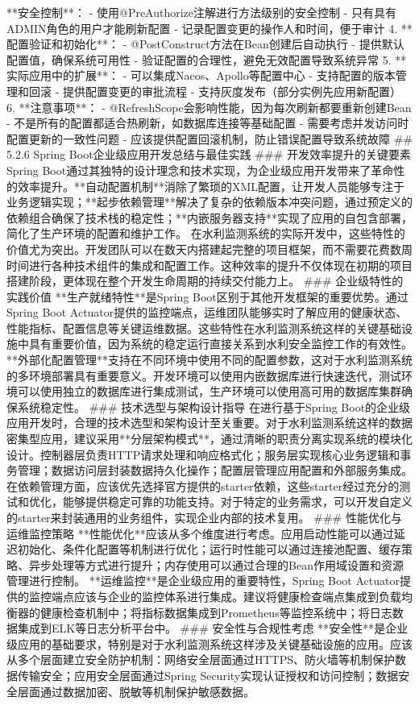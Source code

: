 {{**安全控制**： - 使用@PreAuthorize注解进行方法级别的安全控制 - 只有具有ADMIN角色的用户才能刷新配置 - 记录配置变更的操作人和时间，便于审计 4. **配置验证和初始化**： - @PostConstruct方法在Bean创建后自动执行 - 提供默认配置值，确保系统可用性 - 验证配置的合理性，避免无效配置导致系统异常 5. **实际应用中的扩展**： - 可以集成Nacos、Apollo等配置中心 - 支持配置的版本管理和回滚 - 提供配置变更的审批流程 - 支持灰度发布（部分实例先应用新配置） 6. **注意事项**： - @RefreshScope会影响性能，因为每次刷新都要重新创建Bean - 不是所有的配置都适合热刷新，如数据库连接等基础配置 - 需要考虑并发访问时配置更新的一致性问题 - 应该提供配置回滚机制，防止错误配置导致系统故障 ## 5.2.6 Spring Boot企业级应用开发总结与最佳实践 ### 开发效率提升的关键要素 Spring Boot通过其独特的设计理念和技术实现，为企业级应用开发带来了革命性的效率提升。**自动配置机制**消除了繁琐的XML配置，让开发人员能够专注于业务逻辑实现；**起步依赖管理**解决了复杂的依赖版本冲突问题，通过预定义的依赖组合确保了技术栈的稳定性；**内嵌服务器支持**实现了应用的自包含部署，简化了生产环境的配置和维护工作。 在水利监测系统的实际开发中，这些特性的价值尤为突出。开发团队可以在数天内搭建起完整的项目框架，而不需要花费数周时间进行各种技术组件的集成和配置工作。这种效率的提升不仅体现在初期的项目搭建阶段，更体现在整个开发生命周期的持续交付能力上。 ### 企业级特性的实践价值 **生产就绪特性**是Spring Boot区别于其他开发框架的重要优势。通过Spring Boot Actuator提供的监控端点，运维团队能够实时了解应用的健康状态、性能指标、配置信息等关键运维数据。这些特性在水利监测系统这样的关键基础设施中具有重要价值，因为系统的稳定运行直接关系到水利安全监控工作的有效性。 **外部化配置管理**支持在不同环境中使用不同的配置参数，这对于水利监测系统的多环境部署具有重要意义。开发环境可以使用内嵌数据库进行快速迭代，测试环境可以使用独立的数据库进行集成测试，生产环境可以使用高可用的数据库集群确保系统稳定性。 ### 技术选型与架构设计指导 在进行基于Spring Boot的企业级应用开发时，合理的技术选型和架构设计至关重要。对于水利监测系统这样的数据密集型应用，建议采用**分层架构模式**，通过清晰的职责分离实现系统的模块化设计。控制器层负责HTTP请求处理和响应格式化；服务层实现核心业务逻辑和事务管理；数据访问层封装数据持久化操作；配置层管理应用配置和外部服务集成。 在依赖管理方面，应该优先选择官方提供的starter依赖，这些starter经过充分的测试和优化，能够提供稳定可靠的功能支持。对于特定的业务需求，可以开发自定义的starter来封装通用的业务组件，实现企业内部的技术复用。 ### 性能优化与运维监控策略 **性能优化**应该从多个维度进行考虑。应用启动性能可以通过延迟初始化、条件化配置等机制进行优化；运行时性能可以通过连接池配置、缓存策略、异步处理等方式进行提升；内存使用可以通过合理的Bean作用域设置和资源管理进行控制。 **运维监控**是企业级应用的重要特性，Spring Boot Actuator提供的监控端点应该与企业的监控体系进行集成。建议将健康检查端点集成到负载均衡器的健康检查机制中；将指标数据集成到Prometheus等监控系统中；将日志数据集成到ELK等日志分析平台中。 ### 安全性与合规性考虑 **安全性**是企业级应用的基础要求，特别是对于水利监测系统这样涉及关键基础设施的应用。应该从多个层面建立安全防护机制：网络安全层面通过HTTPS、防火墙等机制保护数据传输安全；应用安全层面通过Spring Security实现认证授权和访问控制；数据安全层面通过数据加密、脱敏等机制保护敏感数据。 }}
